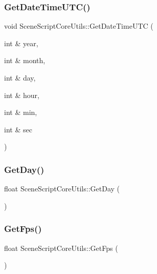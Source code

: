 \hypertarget{class_scene_script_core_utils_a72d964d4efe6e40bca2f81f36b3d47f4}{}\label{class_scene_script_core_utils_a72d964d4efe6e40bca2f81f36b3d47f4} 
\subsubsection{\texorpdfstring{Get\+Date\+Time\+U\+T\+C()}{GetDateTimeUTC()}}
{\footnotesize\ttfamily void Scene\+Script\+Core\+Utils\+::\+Get\+Date\+Time\+U\+TC (\begin{DoxyParamCaption}\item[{int \&}]{year,  }\item[{int \&}]{month,  }\item[{int \&}]{day,  }\item[{int \&}]{hour,  }\item[{int \&}]{min,  }\item[{int \&}]{sec }\end{DoxyParamCaption})}

\hypertarget{class_scene_script_core_utils_a6b33a3054c5f86ec3e7d371e490eae79}{}\label{class_scene_script_core_utils_a6b33a3054c5f86ec3e7d371e490eae79} 
\subsubsection{\texorpdfstring{Get\+Day()}{GetDay()}}
{\footnotesize\ttfamily float Scene\+Script\+Core\+Utils\+::\+Get\+Day (\begin{DoxyParamCaption}{ }\end{DoxyParamCaption})}

\hypertarget{class_scene_script_core_utils_a7380a399dd6dc66de6d0ebb94730269e}{}\label{class_scene_script_core_utils_a7380a399dd6dc66de6d0ebb94730269e} 
\subsubsection{\texorpdfstring{Get\+Fps()}{GetFps()}}
{\footnotesize\ttfamily float Scene\+Script\+Core\+Utils\+::\+Get\+Fps (\begin{DoxyParamCaption}{ }\end{DoxyParamCaption})}

